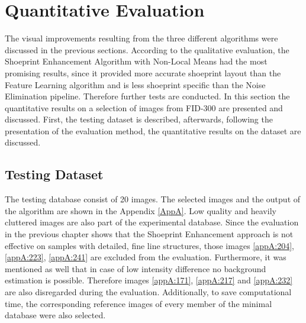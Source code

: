 \documentclass[draft,final]{vutinfth} %
\begin{document}
\section{Quantitative Evaluation}
\par
The visual improvements resulting from the three different algorithms were discussed in the previous sections.
According to the qualitative evaluation, the Shoeprint Enhancement Algorithm with Non-Local Means had the most promising results, since it provided more accurate shoeprint layout than the Feature Learning algorithm and is less shoeprint specific than the Noise Elimination pipeline.
Therefore further tests are conducted.
In this section the quantitative results on a selection of images from FID-300 are presented and discussed.
First, the testing dataset is described, afterwards, following the presentation of the evaluation method, the quantitative results on the dataset are discussed.

\subsection{Testing Dataset}

The testing database consist of 20 images.
The selected images and the output of the algorithm are shown in the Appendix \ref{AppA}.
Low quality and heavily cluttered images are also part of the experimental database.
Since the evaluation in the previous chapter shows that the Shoeprint Enhancement approach is not effective on samples with detailed, fine line structures, those images \ref{appA:204}, \ref{appA:223}, \ref{appA:241} are excluded from the evaluation.
Furthermore, it was mentioned as well that in case of low intensity difference no background estimation is possible. 
Therefore images \ref{appA:171}, \ref{appA:217} and \ref{appA:232} are also disregarded during the evaluation.
Additionally, to save computational time, the corresponding reference images of every member of the minimal database were also selected.
\end{document}
